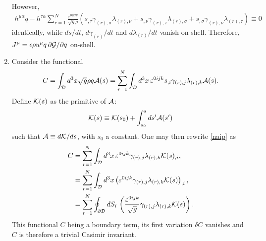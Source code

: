 \documentclass{article}
\numberwithin{equation}{section}
\begin{document}
\begin{appendices}
\begin{enumerate}[leftmargin=*]
\begin{align}
\end{align}
However,
\begin{align}
h^{\mu\alpha} q - h^{\tau\alpha}\sum_{r=1}^N \frac{\varepsilon^{0\mu\sigma\nu}}{\sqrt{g}\rho} \left( s_{,\tau}\gamma_{(r),\sigma} \lambda_{(r),\nu} + s_{,\nu} {\gamma_{(r),\tau}}\lambda_{(r),\sigma} + s_{,\sigma}\gamma_{(r),\nu} {\lambda_{(r),\tau}} \right) \equiv 0
\end{align}
identically, while $ds/dt$, $d\gamma_{(r)}/dt$ and $d\lambda_{(r)}/dt$ vanish on-shell. Therefore, $J^\mu=\epsilon\rho u^\mu q\,\partial{\cal G}/\partial q$ on-shell.
\item Consider the functional
\begin{align}
C=\int_{\cal D} d^3x \sqrt{g} \rho q {\cal A}(s)=\sum_{r=1}^N\int_{\cal D} d^3x \,\varepsilon^{0ijk} s_{,i} \gamma_{(r),j} \lambda_{(r),k} {\cal A}(s). \label{naip}
\end{align}
Define ${\cal K}(s)$ as the primitive of $\cal A$:
\begin{align}
{\cal K}(s) \equiv {\cal K}(s_0) + \int_{s_0}^s ds' {\cal A}(s')
\end{align}
such that ${\cal A}\equiv d{\cal K}/ds$, with $s_0$ a constant. One may then rewrite \eqref{naip} as
\begin{align}
C&=\sum_{r=1}^N\int_{\cal D} d^3x \,\varepsilon^{0ijk} \gamma_{(r),j} \lambda_{(r),k} {\cal K}(s)_{,i}, \nonumber \\
&=\sum_{r=1}^N\int_{\cal D} d^3x \left( \varepsilon^{0ijk} \gamma_{(r),j} \lambda_{(r),k} {\cal K}(s) \right)_{,i}, \nonumber \\
&=\sum_{r=1}^N\oint_{\partial{\cal D}} dS_i\,\left( \frac{\varepsilon^{0ijk}}{\sqrt{g}} \gamma_{(r),j} \lambda_{(r),k} {\cal K}(s) \right).
\end{align}
This functional $C$ being a boundary term, its first variation $\delta C$ vanishes and $C$ is therefore a trivial Casimir invariant.
\end{enumerate}
\end{appendices}



\end{document}
